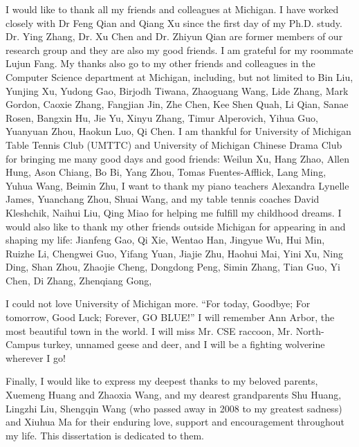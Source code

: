 I would like to thank all my friends and colleagues at Michigan. I have worked closely with Dr Feng Qian and Qiang Xu since the first day of my Ph.D. study. Dr. Ying Zhang, Dr. Xu Chen and Dr. Zhiyun Qian are former members of our research group and they are also my good friends. I am grateful for my roommate Lujun Fang. My thanks also go to my other friends and colleagues in the Computer Science department at Michigan, including, but not limited to Bin Liu, Yunjing Xu, Yudong Gao, Birjodh Tiwana, Zhaoguang Wang, Lide Zhang, Mark Gordon, Caoxie Zhang, Fangjian Jin, Zhe Chen, Kee Shen Quah, Li Qian, Sanae Rosen, Bangxin Hu, Jie Yu, Xinyu Zhang, Timur Alperovich, Yihua Guo, Yuanyuan Zhou, Haokun Luo, Qi Chen. I am thankful for University of Michigan Table Tennis Club (UMTTC) and University of Michigan Chinese Drama Club for bringing me many good days and good friends: Weilun Xu, Hang Zhao, Allen Hung, Ason Chiang, Bo Bi, Yang Zhou, Tomas Fuentes-Afflick, Lang Ming, Yuhua Wang, Beimin Zhu, \etc I want to thank my piano teachers Alexandra Lynelle James, Yuanchang Zhou, Shuai Wang, and my table tennis coaches David Kleshchik, Naihui Liu, Qing Miao for helping me fulfill my childhood dreams. I would also like to thank my other friends outside Michigan for appearing in and shaping my life: Jianfeng Gao, Qi Xie, Wentao Han, Jingyue Wu, Hui Min, Ruizhe Li, Chengwei Guo, Yifang Yuan, Jiajie Zhu, Haohui Mai, Yini Xu, Ning Ding, Shan Zhou, Zhaojie Cheng, Dongdong Peng, Simin Zhang, Tian Guo, Yi Chen, Di Zhang, Zhenqiang Gong, \etc

I could not love University of Michigan more. ``For today, Goodbye; For tomorrow, Good Luck; Forever, GO BLUE!'' I will remember Ann Arbor, the most beautiful town in the world. I will miss Mr. CSE raccoon, Mr. North-Campus turkey, unnamed geese and deer, and I will be a fighting wolverine wherever I go!

Finally, I would like to express my deepest thanks to my beloved parents, Xuemeng Huang and Zhaoxia Wang, and my dearest grandparents Shu Huang, Lingzhi Liu, Shengqin Wang (who passed away in 2008 to my greatest sadness) and Xiuhua Ma for their enduring love, support and encouragement throughout my life. This dissertation is dedicated to them.

\label{ACKNOWLEDGEMENTS}
